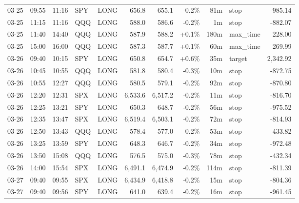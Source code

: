 \documentclass[11pt,a4paper,twoside]{article}
\begin{document}
\begin{center}
\begin{longtable}{>{\color{txtmain}}l l l l l r r r r >{\color{txtmain}}l r}
03-25 & 09:55 & 11:16 & SPY & LONG & 656.8 & 655.1 & \textcolor{lossred}{-0.2\%} & 81m & stop & \textcolor{lossred}{-985.14} \\
03-25 & 11:15 & 11:16 & QQQ & LONG & 588.0 & 586.6 & \textcolor{lossred}{-0.2\%} & 1m & stop & \textcolor{lossred}{-882.07} \\
03-25 & 11:40 & 14:40 & QQQ & LONG & 587.9 & 588.2 & \textcolor{wingreen}{+0.1\%} & 180m & max\_time & \textcolor{wingreen}{228.00} \\
03-25 & 15:00 & 16:00 & QQQ & LONG & 587.3 & 587.7 & \textcolor{wingreen}{+0.1\%} & 60m & max\_time & \textcolor{wingreen}{269.99} \\
03-26 & 09:40 & 10:15 & SPY & LONG & 650.8 & 654.7 & \textcolor{wingreen}{+0.6\%} & 35m & target & \textcolor{wingreen}{2,342.92} \\
03-26 & 10:45 & 10:55 & QQQ & LONG & 581.8 & 580.4 & \textcolor{lossred}{-0.3\%} & 10m & stop & \textcolor{lossred}{-872.75} \\
03-26 & 10:55 & 12:27 & QQQ & LONG & 580.5 & 579.1 & \textcolor{lossred}{-0.2\%} & 92m & stop & \textcolor{lossred}{-870.80} \\
03-26 & 12:20 & 12:31 & SPX & LONG & 6,533.6 & 6,517.2 & \textcolor{lossred}{-0.2\%} & 11m & stop & \textcolor{lossred}{-816.70} \\
03-26 & 12:25 & 13:21 & SPY & LONG & 650.3 & 648.7 & \textcolor{lossred}{-0.2\%} & 56m & stop & \textcolor{lossred}{-975.52} \\
03-26 & 12:35 & 13:47 & SPX & LONG & 6,519.4 & 6,503.1 & \textcolor{lossred}{-0.2\%} & 72m & stop & \textcolor{lossred}{-814.93} \\
03-26 & 12:50 & 13:43 & QQQ & LONG & 578.4 & 577.0 & \textcolor{lossred}{-0.2\%} & 53m & stop & \textcolor{lossred}{-433.82} \\
03-26 & 13:25 & 13:59 & SPY & LONG & 648.3 & 646.7 & \textcolor{lossred}{-0.2\%} & 34m & stop & \textcolor{lossred}{-972.48} \\
03-26 & 13:50 & 15:08 & QQQ & LONG & 576.5 & 575.0 & \textcolor{lossred}{-0.3\%} & 78m & stop & \textcolor{lossred}{-432.34} \\
03-26 & 14:00 & 15:54 & SPX & LONG & 6,491.1 & 6,474.9 & \textcolor{lossred}{-0.2\%} & 114m & stop & \textcolor{lossred}{-811.39} \\
03-27 & 09:40 & 09:55 & SPX & LONG & 6,434.9 & 6,418.8 & \textcolor{lossred}{-0.2\%} & 15m & stop & \textcolor{lossred}{-804.36} \\
03-27 & 09:40 & 09:56 & SPY & LONG & 641.0 & 639.4 & \textcolor{lossred}{-0.2\%} & 16m & stop & \textcolor{lossred}{-961.45} \\

\end{longtable}
\end{center}
\end{document}
